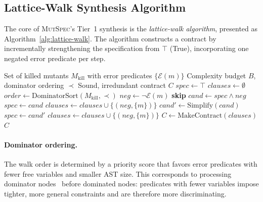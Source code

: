 \documentclass[11pt]{article}
\begin{document}
\subsection{Lattice-Walk Synthesis Algorithm}
\label{sec:lattice-walk}

The core of \textsc{MutSpec}'s Tier~1 synthesis is the \emph{lattice-walk
algorithm}, presented as Algorithm~\ref{alg:lattice-walk}. The algorithm
constructs a contract by incrementally strengthening the specification from
$\top$ (True), incorporating one negated error predicate per step.

\begin{algorithm}[t]
\caption{Lattice-Walk Contract Synthesis}
\label{alg:lattice-walk}
\begin{algorithmic}[1]
\REQUIRE Set of killed mutants $M_{\mathrm{kill}}$ with error predicates $\{\mathcal{E}(m)\}$
\REQUIRE Complexity budget $B$, dominator ordering $\prec$
\ENSURE Sound, irredundant contract $C$
\STATE $\mathit{spec} \leftarrow \top$ 
\STATE $\mathit{clauses} \leftarrow \emptyset$
\STATE $\mathit{order} \leftarrow \mathrm{DominatorSort}(M_{\mathrm{kill}}, \prec)$
  \STATE $\mathit{neg} \leftarrow \neg\mathcal{E}(m)$ 
    \STATE \textbf{skip} 
  \ELSE
    \STATE $\mathit{cand} \leftarrow \mathit{spec} \land \mathit{neg}$
      \STATE $\mathit{spec} \leftarrow \mathit{cand}$
      \STATE $\mathit{clauses} \leftarrow \mathit{clauses} \cup \{(\mathit{neg}, \{m\})\}$
      \STATE $\mathit{cand'} \leftarrow \mathrm{Simplify}(\mathit{cand})$
        \STATE $\mathit{spec} \leftarrow \mathit{cand'}$
        \STATE $\mathit{clauses} \leftarrow \mathit{clauses} \cup \{(\mathit{neg}, \{m\})\}$
      \ENDIF
    \ENDIF
  \ENDIF
\ENDFOR
\STATE $C \leftarrow \mathrm{MakeContract}(\mathit{clauses})$
\RETURN $C$
\end{algorithmic}
\end{algorithm}

\paragraph{Dominator ordering.} The walk order is determined by a priority score
that favors error predicates with fewer free variables and smaller AST size.
This corresponds to processing dominator nodes~\cite{kurtz2016} before dominated
nodes: predicates with fewer variables impose tighter, more general constraints
and are therefore more discriminating.
\end{document}
